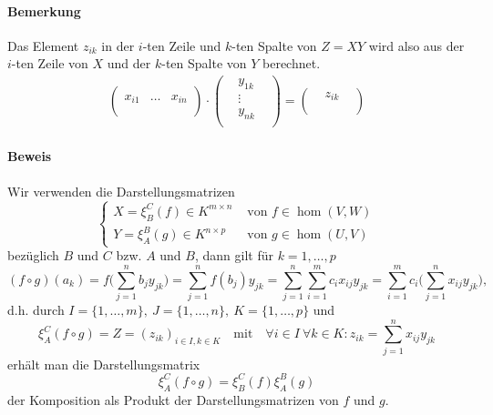 	\paragraph{Bemerkung}
		Das Element $ z_{ik} $ in der $ i $-ten Zeile und $ k $-ten Spalte von $ Z = XY $ wird also aus der $ i $-ten Zeile von $ X $ und der $k$-ten Spalte von $ Y $ berechnet.
		\begin{align*}
			\left(
			\begin{array}{ccc}
			       &        &        \\
			x_{i1} & \dots  & x_{in} \\
			       &        &        \\
			\end{array}
			\right)
			\cdot
			\left(
			\begin{array}{ccc}
			       & y_{1k} &        \\
			       & \vdots &        \\
			       & y_{nk} &        \\
			\end{array}
			\right)
			=
			\left(
			\begin{array}{ccc}
			       & z_{ik} &        \\
			       &        &        \\
			\end{array}
			\right)
		\end{align*}
	\paragraph{Beweis}
		Wir verwenden die Darstellungsmatrizen
		\[
			\begin{cases}
				X = \xi^C_B(f)\in K^{m\times n} & \text{ von } f\in \hom(V,W) \\
				Y = \xi_A^B(g)\in K^{n\times p} & \text{ von } g\in \hom(U,V)
			\end{cases}
		\]
		bezüglich $ B $ und $ C $ bzw. $ A $ und $ B $, dann gilt für $ k=1,\dots,p $
		\[
			(f\circ g)(a_k)=f\Big(\sum_{j=1}^{n}b_jy_{jk}\Big) = \sum_{j=1}^{n}f(b_j)y_{jk} = \sum_{j=1}^{n}\sum_{i=1}^{m}c_ix_{ij}y_{jk} = \sum_{i=1}^{m}c_i\Big(\sum_{j=1}^{n}x_{ij}y_{jk}\Big),
		\]
		d.h. durch $ I=\{1,\dots,m\},\ J=\{1,\dots,n\},\ K=\{1,\dots,p\} $ und
		\[
			\xi_A^C(f\circ g) = Z = (z_{ik})_{i\in I,k\in K} \quad\text{mit}\quad \forall i\in I\ \forall k\in K: z_{ik}= \sum_{j=1}^{n}x_{ij}y_{jk}
		\]
		erhält man die Darstellungsmatrix
		\[
			\xi_A^C(f\circ g) = \xi_B^C(f)\xi_A^B(g)
		\]
		der Komposition als Produkt der Darstellungsmatrizen von $ f $ und $ g $.

